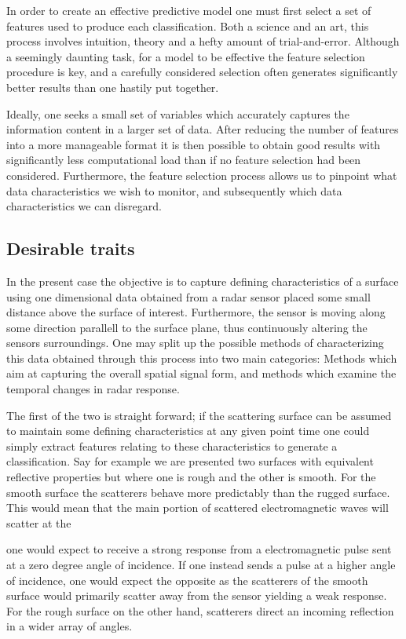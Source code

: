 \documentclass[a4paper, 12pt]{article}
\begin{document}
In order to create an effective predictive model one must first select a set of features used to produce each classification. Both a science and an art, this process involves intuition, theory and a hefty amount of trial-and-error. Although a seemingly daunting task, for a model to be effective the feature selection procedure is key, and a carefully considered selection often generates significantly better results than one hastily put together. 

Ideally, one seeks a small set of variables which accurately captures the information content in a larger set of data. After reducing the number of features into a more manageable format it is then possible to obtain good results with significantly less computational load than if no feature selection had been considered. Furthermore, the feature selection process allows us to pinpoint what data characteristics we wish to monitor, and subsequently which data characteristics we can disregard. 

\subsection{Desirable traits}

In the present case the objective is to capture defining characteristics of a surface using one dimensional data obtained from a radar sensor placed some small distance above the surface of interest. Furthermore, the sensor is moving along some direction parallell to the surface plane, thus continuously altering the sensors surroundings. One may split up the possible methods of characterizing this data obtained through this process into two main categories: Methods which aim at capturing the overall spatial signal form, and methods which examine the temporal changes in radar response. 

The first of the two is straight forward; if the scattering surface can be assumed to maintain some defining characteristics at any given point time one could simply extract features relating to these characteristics to generate a classification. Say for example we are presented two surfaces with equivalent reflective properties but where one is rough and the other is smooth. For the smooth surface the scatterers behave more predictably than the rugged surface. This would mean that the main portion of scattered electromagnetic waves will scatter at the

one would expect to receive a strong response from a electromagnetic pulse sent at a zero degree angle of incidence. If one instead sends a pulse at a higher angle of incidence, one would expect the opposite as the scatterers of the smooth surface would primarily scatter away from the sensor yielding a weak response. For the rough surface on the other hand, scatterers direct an incoming reflection in a wider array of angles. 
\end{document}
